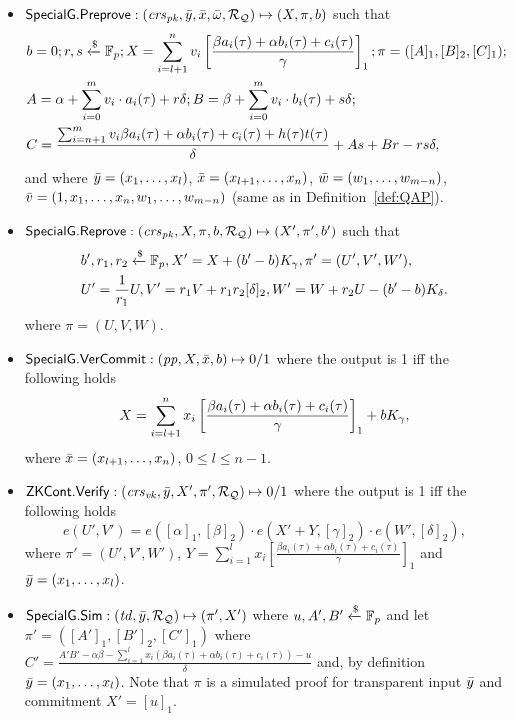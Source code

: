 \begin{definition}
\begin{itemize}
\item ${\mathsf{SpecialG}}.{\mathsf{Preprove}}: (\mathit{crs}_{\mathit{pk}}, \bar{y}, \bar{x}, \bar{\omega}, \mathcal{R}_{\mathcal{Q}}) \mapsto (X, \pi, b)$ such that \\
\begin{align*}
&b = 0; r, s\xleftarrow{\$} \mathbb{F}_p; X = \sum_{i=l+1}^{n} v_i\left[ \frac{\beta a_i(\tau)+ \alpha b_i(\tau)+ c_i(\tau)}{\gamma} \right]_1; \pi = ([A]_1, [B]_2, [C]_1); \\
&A = \alpha + \sum_{i=0}^{m} v_i \cdot a_i(\tau) + r\delta; B = \beta + \sum_{i=0}^{m} v_i \cdot b_i(\tau) + s\delta; \\ 
&C = \frac{\sum_{i=n+1}^{m} v_i \beta a_i(\tau)+ \alpha b_i(\tau)+ c_i(\tau) + h(\tau)t(\tau)}{\delta}   + As + Br - rs\delta, 
\end{align*}
and where $\bar{y} = (x_1, \ldots, x_l)$, $\bar{x} = (x_{l+1}, \ldots, x_n)$, $\bar{w} = (w_1, \ldots, w_{m-n})$, \\
$\bar{v} = (1, x_1, \ldots, x_n, w_1, \ldots, w_{m-n})$ (same as in Definition~\ref{def:QAP}).


\item ${\mathsf{SpecialG}}.{\mathsf{Reprove}}: (\mathit{crs}_{\mathit{pk}}, X, \pi, b, \mathcal{R}_{\mathcal{Q}}) \mapsto (X', \pi', b')$  such that
\begin{align*}
&b ', r_1, r_2  \xleftarrow{\$} \mathbb{F}_p, X' = X + (b'- b) K_{\gamma}, \pi' = (U', V', W'), \\
&U' = \frac{1}{r_1} U, V' = r_1 V + r_1r_2[\delta]_2, W' = W + r_2U  - (b' - b) K_{\delta} .
\end{align*}
\noindent where $\pi = (U, V, W)$.
 
\item ${\mathsf{SpecialG}}.{\mathsf{VerCommit}}: (\mathit{pp}, X, \bar{x}, b) \mapsto 0/1$ where the output is 1 iff the following holds
$$X = \sum_{i=l+1}^{n} x_i\left[ \frac{\beta a_i(\tau)+ \alpha b_i(\tau)+ c_i(\tau)}{\gamma} \right]_1  + b K_{\gamma},$$
where $\bar{x} = (x_{l+1}, \ldots, x_n)$, $ 0 \leq l \leq n-1$. 
\item ${\mathsf{ZKCont}}.{\mathsf{Verify}}: (\mathit{crs}_{\mathit{vk}}, \bar{y}, X', \pi', \mathcal{R}_{\mathcal{Q}}) \mapsto 0/1$ where the output is 1 iff the following holds 
$$e(U',V') = e([\alpha]_1, [\beta]_2) \cdot e(X' + Y, [\gamma]_2) \cdot e(W', [\delta]_2),$$
where $\pi' = (U', V', W')$, $Y = \sum_{i=1}^{l} x_i\left[ \frac{\beta a_i(\tau)+ \alpha b_i(\tau)+ c_i(\tau)}{\gamma} \right]_1$ 
and $\bar{y} = (x_1, \ldots, x_l)$.

\item ${\mathsf{SpecialG}}.{\mathsf{Sim}}: (\mathit{td}, \bar{y}, \mathcal{R}_{\mathcal{Q}}) \mapsto (\pi', X')$ where $u, A', B' \xleftarrow {\$} \mathbb{F}_p$ and let \\
$\pi' = ([A']_1, [B']_2, [C']_1)$ where $C' = \frac{A'B' - \alpha \beta - \sum_{i=1}^{l} x_i (\beta a_i(\tau)+ \alpha b_i(\tau)+ c_i(\tau))- u}{\delta}  $ and, 
by definition $\bar{y} = (x_1, \ldots, x_l)$. Note that $\pi$ is a simulated proof for transparent input $\bar{y}$ and commitment $X' = [u]_1$.
\end{itemize} 
\end{definition}

